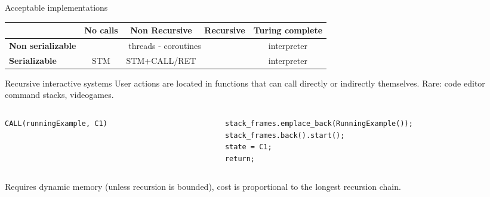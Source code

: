 \documentclass[aspectratio=169,11pt]{beamer}
\begin{document}
\begin{frame}{Acceptable implementations}
\renewcommand{\arraystretch}{1.3} %
\setlength{\tabcolsep}{3pt}       %


\begin{tabularx}{\textwidth}{l|c|c|c|c}
\hline
 & \textbf{No calls}
 & \textbf{Non Recursive}
 & \textbf{Recursive}
 & \textbf{Turing complete} \\
\hline
    \textbf{Non serializable}       &  \multicolumn{3}{|c|}{threads - coroutines} & interpreter  \\
\hline
\textbf{Serializable}        & STM & STM+CALL/RET &  &  interpreter \\
\hline
\end{tabularx}
\end{frame}

\begin{frame}{Recursive interactive systems}
User actions are located in functions that can call directly or indirectly themselves.
Rare: code editor command stacks, videogames.
\begin{columns}[T,onlytextwidth]
\begin{column}{0.50\textwidth}
\begin{lstlisting}[style=cppstyle, numbers=none]
CALL(runningExample, C1)
\end{lstlisting}
\end{column}
\begin{column}{0.48\textwidth}
\begin{lstlisting}[style=cppstyle, numbers=none]
stack_frames.emplace_back(RunningExample());
stack_frames.back().start();
state = C1;
return;
\end{lstlisting}
\end{column}
\end{columns}


Requires dynamic memory (unless recursion is bounded), cost is proportional to the longest recursion chain.
\end{frame}
\end{document}
